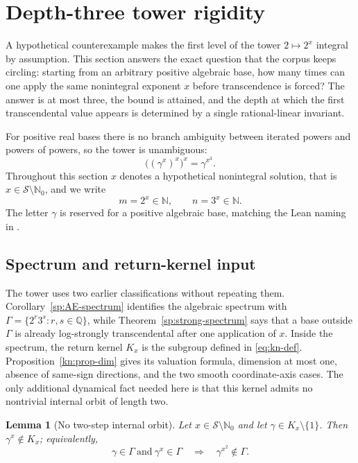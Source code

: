 \documentclass[11pt,oneside]{article}
\newtheorem{lemma}[theorem]{Lemma}
\theoremstyle{definition}
\theoremstyle{remark}
\newcommand{\N}{\mathbb N}
\newcommand{\Nzero}{\mathbb N_0}
\newcommand{\Q}{\mathbb Q}
\newcommand{\Sol}{\mathcal S}
\newcommand{\GammaSat}{\Gamma}
\newcommand{\lean}[1]{\texttt{\detokenize{#1}}}
\begin{document}
\section{Depth-three tower rigidity}
\label{sec:tower}

A hypothetical counterexample makes the first level of the tower $2\mapsto2^x$ integral by
assumption.  This section answers the exact question that the corpus keeps circling: starting
from an arbitrary positive algebraic base, how many times can one apply the same nonintegral
exponent $x$ before transcendence is forced?  The answer is at most three, the bound is
attained, and the depth at which the first transcendental value appears is determined by a
single rational-linear invariant.

For positive real bases there is no branch ambiguity between iterated powers and powers of
powers, so the tower is unambiguous:
\[
 \bigl((\gamma^x)^x\bigr)^x=\gamma^{x^3}.
\]
Throughout this section $x$ denotes a hypothetical nonintegral solution, that is
$x\in\Sol\setminus\Nzero$, and we write
\[
 m=2^x\in\N,\qquad n=3^x\in\N .
\]
The letter $\gamma$ is reserved for a positive algebraic base, matching the Lean naming in
\lean{AlgebraicBaseUnitPower}.

\subsection{Spectrum and return-kernel input}

The tower uses two earlier classifications without repeating them.  Corollary~\ref{sp:AE-spectrum}
identifies the algebraic spectrum with
$\GammaSat=\{2^r3^s:r,s\in\Q\}$, while Theorem~\ref{sp:strong-spectrum} says that a base
outside $\GammaSat$ is already log-strongly transcendental after one application of $x$.
Inside the spectrum, the return kernel $K_x$ is the subgroup defined in \eqref{eq:kn-def}.
Proposition~\ref{kn:prop-dim} gives its valuation formula, dimension at most one, absence of
same-sign directions, and the two smooth coordinate-axis cases.  The only additional
dynamical fact needed here is that this kernel admits no nontrivial internal orbit of length
two.

\begin{lemma}[No two-step internal orbit]
\label{tw:no-two-step}
Let $x\in\Sol\setminus\Nzero$ and let $\gamma\in K_x\setminus\{1\}$.  Then
$\gamma^x\notin K_x$; equivalently,
\[
 \gamma\in\GammaSat\ \text{and}\ \gamma^x\in\GammaSat
 \quad\Longrightarrow\quad
 \gamma^{x^2}\notin\GammaSat .
\]
\end{lemma}
\end{document}
